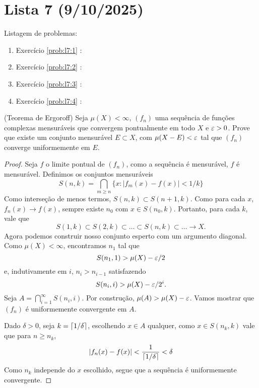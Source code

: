 \clearpage
\section{Lista 7 (9/10/2025)}

Listagem de problemas:
\begin{enumerate}
    \item Exercício \ref{prob:l7:1} : \checkmark
    \item Exercício \ref{prob:l7:2} : \checkmark
    \item Exercício \ref{prob:l7:3} : \checkmark
    \item Exercício \ref{prob:l7:4} : \Frowny
\end{enumerate}


\begin{problem}
    \label{prob:l7:1}
    (Teorema de Ergoroff) Seja $\mu(X) < \infty$, $(f_n)$ uma sequência de funções complexas mensuráveis que convergem pontualmente em todo $X$
    e $\varepsilon > 0$. Prove que existe um conjunto mensurável $E \subset X$, com $\mu(X - E) < \varepsilon$ tal que $(f_n)$ converge uniformemente em $E$.
\end{problem}
\begin{proof}
    Seja $f$ o limite pontual de $(f_n)$, como a sequência é mensurável, $f$ é mensurável.
    Definimos os conjuntos mensuráveis 
    $$S(n,k) = \bigcap_{m \geq n} \{x : |f_m(x) - f(x)| < 1/k\}$$
    Como interseção de menos termos, $S(n,k) \subset S(n+1,k)$. Como para cada $x$, $f_n(x) \to f(x)$, 
    sempre existe $n_0$ com $x \in S(n_0, k)$. Portanto, para cada $k$, vale que 
    $$S(1,k) \subset S(2,k) \subset \dots \subset S(n,k) \subset \dots \to X.$$
    Agora podemos construir nosso conjunto esperto com um argumento diagonal. Como $\mu(X) < \infty$, encontramos $n_1$
    tal que 
    $$S(n_1, 1) > \mu(X) - \varepsilon/2$$
    e, indutivamente em $i$, $n_{i} > n_{i-1}$ satisfazendo %
    $$S(n_i, i) > \mu(X) - \varepsilon/2^i.$$
    Seja $A = \bigcap_{i=1}^\infty S(n_i,i)$. Por construção, $\mu(A) > \mu(X) - \varepsilon$. Vamos mostrar que $(f_n)$ é uniformemente
    convergente em $A$. 
    
    Dado $\delta > 0$, seja $k = \lceil 1/\delta \rceil$,  escolhendo $x \in A$ qualquer, como $x \in S(n_k,k)$ vale que 
    para $n \geq n_k$, 
    $$|f_n(x) - f(x)| < \frac{1}{\lceil 1/\delta \rceil} < \delta$$
    Como $n_k$ independe do $x$ escolhido, segue que a sequência é uniformemente convergente. 
\end{proof}

